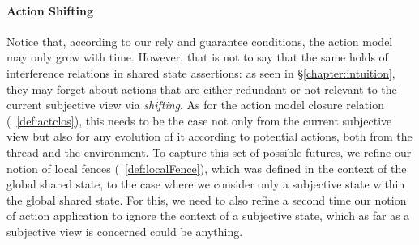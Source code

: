 \paragraph{Action Shifting}
Notice that, according to our rely and guarantee conditions, the action model may only grow with time. However, that is not to say that the same holds of interference relations in shared state assertions: as seen in \S\ref{chapter:intuition}, they may forget about actions that are either redundant or not relevant to the current subjective view via \emph{shifting}. As for the action model closure relation (~\ref{def:actclos}), this needs to be the case not only from the current subjective view but also for any evolution of it according to potential actions, both from the thread and the environment. To capture this set of possible futures, we refine our notion of local fences (~\ref{def:localFence}), which was defined in the context of the global shared state, to the case where we consider only a subjective state within the global shared state.
For this, we need to also refine a second time our notion of action application to ignore the context of a subjective state, which as far as a subjective view is concerned could be anything.


